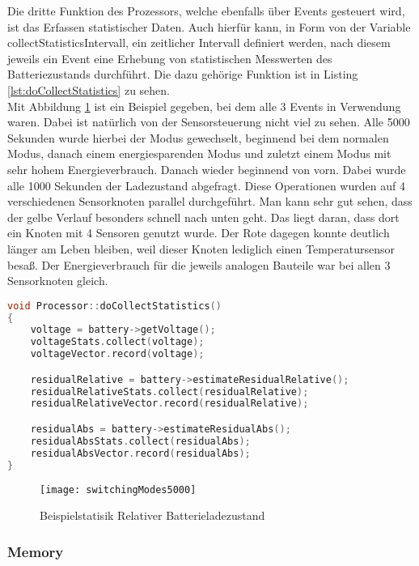 Die dritte Funktion des Prozessors, welche ebenfalls über Events gesteuert wird, ist das Erfassen statistischer Daten. Auch hierfür kann, in Form von der Variable collectStatisticsIntervall, ein zeitlicher Intervall definiert werden, nach diesem jeweils ein Event eine Erhebung von statistischen Messwerten des Batteriezustands durchführt. Die dazu gehörige Funktion ist in Listing \ref{lst:doCollectStatistics} zu sehen.\\
Mit Abbildung \ref{fig:switchingModes5000} ist ein Beispiel gegeben, bei dem alle 3 Events in Verwendung waren. Dabei ist natürlich von der Sensorsteuerung nicht viel zu sehen. Alle 5000 Sekunden wurde hierbei der Modus gewechselt, beginnend bei dem normalen Modus, danach einem energiesparenden Modus und zuletzt einem Modus mit sehr hohem Energieverbrauch. Danach wieder beginnend von vorn. Dabei wurde alle 1000 Sekunden der Ladezustand abgefragt. Diese Operationen wurden auf 4 verschiedenen Sensorknoten parallel durchgeführt. Man kann sehr gut sehen, dass der gelbe Verlauf besonders schnell nach unten geht. Das liegt daran, dass dort ein Knoten mit 4 Sensoren genutzt wurde. Der Rote dagegen konnte deutlich länger am Leben bleiben, weil dieser Knoten lediglich einen Temperatursensor besaß. Der Energieverbrauch für die jeweils analogen Bauteile war bei allen 3 Sensorknoten gleich.

\begin{minipage}{\textwidth}
\begin{lstlisting}[language=C++, label=lst:doCollectStatistics, caption=doCollectStatistics()]
void Processor::doCollectStatistics()
{
    voltage = battery->getVoltage();
    voltageStats.collect(voltage);
    voltageVector.record(voltage);

    residualRelative = battery->estimateResidualRelative();
    residualRelativeStats.collect(residualRelative);
    residualRelativeVector.record(residualRelative);

    residualAbs = battery->estimateResidualAbs();
    residualAbsStats.collect(residualAbs);
    residualAbsVector.record(residualAbs);
}
\end{lstlisting}
\end{minipage}

\begin{figure}[htbp]
\centering
\caption{Beispielstatisik Relativer Batterieladezustand}
\label{fig:switchingModes5000}
\texttt{[image: switchingModes5000]}
\end{figure}

\subsubsection{Memory}

